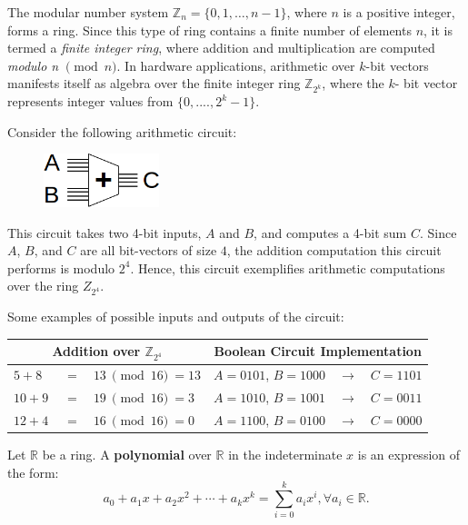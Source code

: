 The modular number system $\mathbb{Z}_n = \{0, 1, \ldots, n-1\}$, where $n$ 
is a positive integer, forms a ring.
Since this type of ring contains a finite number of elements $n$,
it is termed a {\it finite integer ring}, where addition and multiplication 
are computed {\it modulo n} $\pmod {n}$. 
In hardware applications, arithmetic over $k$-bit vectors manifests itself 
as algebra over the finite integer ring $\mathbb{Z}_{2^k}$, where the $k$-
bit vector represents integer values from $\{0, ...., 2^k-1\}$.

\begin{Example}
\label{exp:4bitadder}
Consider the following arithmetic circuit:

\begin{figure}[!h]
\centerline{
\includegraphics[width=0.3\textwidth]{figures/4bitMultTop}
}
\end{figure}

This circuit takes two 4-bit inputs, $A$ and $B$, and computes a 4-bit sum $C$. 
Since $A$, $B$, and $C$ are all bit-vectors of size $4$, 
the addition computation this circuit performs is modulo $2^4$.
Hence, this circuit exemplifies arithmetic computations over the ring $Z_{2^4}$.

Some examples of possible inputs and outputs of the circuit:
\begin{table}[!h]
	\centering
	\begin{tabular}{|lll|lll|}
	\hline
	\multicolumn{3}{|c|}{Addition over $\mathbb{Z}_{2^4}$} & \multicolumn{3}{c|}{Boolean Circuit Implementation} \\
	\hline
	$5 + 8$ & $~=$ & $13 ~\pmod{16} ~= 13$ & $A=0101$, $B=1000$ & $\rightarrow$ &  $C=1101$ \\
	$10 + 9$ & $~=$ & $ 19 ~\pmod{16} ~= 3$ & $A=1010$, $B=1001$ & $\rightarrow$ &  $C=0011$ \\
	$12 + 4$ & $~=$ & $ 16 ~\pmod{16} ~= 0$ & $A=1100$, $B=0100$ & $\rightarrow$ &  $C=0000$ \\
	\hline
	\end{tabular}
\end{table}
\end{Example}

\begin{Definition}\label{def:poly}
Let $\mathbb{R}$ be a ring. A {\bf polynomial} over $\mathbb{R}$ in the 
indeterminate $x$ is an expression of the form:
\begin{equation} \label{eq:poly1}
a_0 + a_1 x + a_2 x^2 + \cdots + a_k x^k = \sum_{i=0}^{k} a_i x^i, \forall a_i \in \mathbb{R}. 
\end{equation}

\end{Definition}

